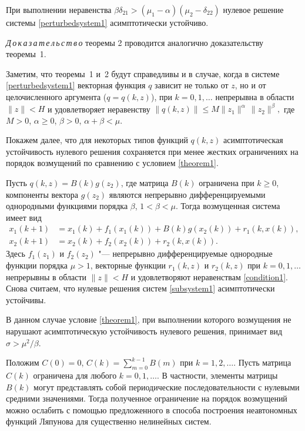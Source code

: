 \smallskip

\begin{theorem}[2] При выполнении неравенства $ \beta
\delta_{21}>(\mu_1-\alpha)(\mu_2-\delta_{22}) $ нулевое решение
системы \eqref{perturbedsystem1} асимптотически устойчиво\rm.
\end{theorem}

\smallskip
{\it Д\,о\,к\,а\,з\,а\,т\,е\,л\,ь\,с\,т\,в\,о\/} теоремы 2 проводится аналогично доказательству
теоремы~1.

\smallskip

Заметим, что теоремы~1 и~2 будут справедливы и в случае, когда в системе
\eqref{perturbedsystem1}  векторная функция $q$ зависит не только от $z$,
но и от целочисленного аргумента ($q=q(k, z)$), при $k=0, 1, \ldots$ непрерывна в
области $\|z\|<H$ и удовлетворяет неравенству $ \|q(k, z)\|\leq
M\|z_1\|^{\alpha}\,\|z_2\|^{\beta}, $ где $M>0$, $\alpha\geq0$,
$\beta>0$, $\alpha+\beta<\mu$.

Покажем далее, что для некоторых типов функций $q(k, z)$ асимптотическая устойчивость
нулевого решения сохраняется при менее жестких ограничениях на
порядок возмущений по сравнению с условием \eqref{theorem1}.


Пусть $q(k, z)=B(k)g(z_2)$, где матрица $B(k)$
ограничена при $k\geq0$, компоненты вектора $g(z_2)$ являются
непрерывно дифференцируемыми однородными функциями порядка
$\beta$, $1<\beta<\mu$. Тогда возмущенная система имеет вид
\begin{equation}
\begin{aligned}
x_1(k+1)&=x_1(k)+f_1(x_1(k))+B(k)g(x_2(k))+r_1(k,x(k)),\\
x_2(k+1)&=x_2(k)+f_2(x_2(k))+r_2(k,x(k)).\label{perturbedsystem2}
\end{aligned}
\end{equation}
Здесь $f_1(z_1)$ и $f_2(z_2)$ "--- непрерывно дифференцируемые
однородные функции порядка $\mu>1$, векторные функции $r_1(k, z)$ и
$r_2(k, z)$ при $k=0, 1, \ldots$ непрерывны в области $\|z\|<H$ и
удовлетворяют неравенствам \eqref{condition1}. Снова считаем, что
нулевые решения систем \eqref{subsystem1} асимптотически
устойчивы.

В данном случае условие \eqref{theorem1}, при выполнении которого
возмущения не нарушают асимптотическую устойчивость нулевого
решения, принимает вид  $\sigma>\mu^2/\beta$.

Положим
$
C(0)=0$, $C(k)=\sum_{m=0}^{k-1} B(m)$ при $k=1, 2, \ldots$.
Пусть матрица $C(k)$ ограничена для любого  $k=0, 1, \ldots$. В
частности, элементы матрицы $B(k)$ могут представлять собой
периодические последовательности с нулевыми средними значениями.
Тогда полученное ограничение на порядок возмущений можно ослабить
с помощью предложенного в \cite{sultan:bib12} способа построения неавтономных
функций Ляпунова для существенно нелинейных систем.

